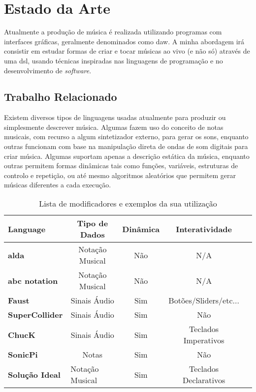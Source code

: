 \chapter{Estado da Arte}
Atualmente a produção de música é realizada utilizando programas com interfaces gráficas, geralmente denominados como \acrfull{daw}. A minha abordagem irá consistir em estudar formas de criar e tocar músicas ao vivo (e não só) através de uma \acrfull{dsl}, usando técnicas inspiradas nas linguagens de programação e no desenvolvimento de \textit{software}.

\section{Trabalho Relacionado}
Existem diversos tipos de linguagens usadas atualmente para produzir ou simplesmente descrever música. Algumas fazem uso do conceito de notas musicais, com recurso a algum sintetizador externo, para gerar os sons, enquanto outras funcionam com base na manipulação direta de ondas de som digitais para criar música. Algumas suportam apenas a descrição estática da música, enquanto outras permitem formas dinâmicas tais como funções, variáveis, estruturas de controlo e repetição, ou até mesmo algoritmos aleatórios que permitem gerar músicas diferentes a cada execução.

\begin{table}[h]
\centering
\def\arraystretch{1.3}
\begin{tabular}{|l|c|c|c|c|}
\hline
\textbf{Language}      & \textbf{Tipo de Dados}               & \textbf{Dinâmica} & \textbf{Interatividade} \\ \hline
\textbf{alda}          & Notação Musical                      & Não               & N/A                     \\ \hline
\textbf{abc notation}  & Notação Musical                      & Não               & N/A                     \\ \hline
\textbf{Faust}         & Sinais Áudio                         & Sim               & Botões/Sliders/etc...   \\ \hline
\textbf{SuperCollider} & Sinais Áudio                         & Sim               & Não                     \\ \hline
\textbf{ChucK}         & Sinais Áudio                         & Sim               & Teclados Imperativos        \\ \hline
\textbf{SonicPi}       & Notas                                & Sim               & Não                     \\ \hline \hline
\textbf{Solução Ideal} & \multicolumn{1}{l|}{Notação Musical} & Sim               & Teclados Declarativos   \\ \hline
\end{tabular}
\caption{Lista de modificadores e exemplos da sua utilização}
\label{tab:sounds-format}
\end{table}

